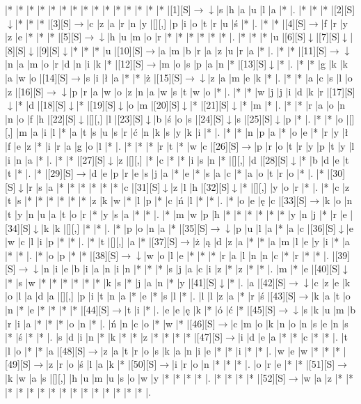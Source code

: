 \documentclass[11pt]{article}
\newcommand\drarr{$\rightarrow \!\!\!\!\! \downarrow$}
\newcommand\rarr{$\rightarrow$}
\newcommand\darr{$\downarrow$}
\begin{document}
\noindent\begin{Puzzle}{22}{31}|*	|*	|*	|*	|*	|*	|*	|*	|*	|*	|*	|*	|*	|*	|*	|[1][S]\drarr	|s	|h	|a	|u	|l	|a	|*	|.
|*	|*	|*	|[2][S]\darr	|*	|*	|*	|[3][S]\rarr	|c	|z	|a	|r	|n	|y	|[][,]{ }	|p	|i	|o	|t	|r	|u	|ś	|*	|.
|*	|*	|[4][S]\rarr	|f	|r	|y	|z	|e	|*	|*	|*	|[5][S]\drarr	|h	|u	|m	|o	|r	|*	|*	|*	|*	|*	|*	|.
|*	|*	|*	|u	|[6][S]\darr	|[7][S]\darr	|[8][S]\darr	|[9][S]\darr	|*	|*	|*	|u	|[10][S]\rarr	|a	|m	|b	|r	|a	|z	|u	|r	|a	|*	|.
|*	|*	|[11][S]\drarr	|n	|a	|m	|o	|r	|d	|n	|i	|k	|*	|[12][S]\rarr	|m	|o	|s	|p	|a	|n	|*	|[13][S]\darr	|*	|.
|*	|*	|g	|k	|k	|a	|w	|o	|[14][S]\rarr	|s	|i	|ł	|a	|*	|*	|ż	|[15][S]\drarr	|z	|a	|m	|e	|k	|*	|.
|*	|*	|a	|c	|s	|l	|o	|z	|[16][S]\drarr	|p	|r	|a	|w	|o	|z	|n	|a	|w	|s	|t	|w	|o	|*	|.
|*	|*	|w	|j	|j	|i	|d	|k	|r	|[17][S]\darr	|*	|d	|[18][S]\darr	|*	|[19][S]\darr	|o	|m	|[20][S]\darr	|*	|[21][S]\darr	|*	|m	|*	|.
|*	|*	|r	|a	|o	|n	|n	|o	|f	|h	|[22][S]\darr	|[][,]{ }	|l	|[23][S]\darr	|b	|ś	|o	|s	|[24][S]\darr	|s	|[25][S]\darr	|p	|*	|.
|*	|*	|o	|[][,]{ }	|m	|a	|i	|l	|*	|a	|t	|s	|u	|s	|r	|ć	|n	|k	|s	|y	|k	|i	|*	|.
|*	|*	|n	|p	|a	|*	|o	|e	|*	|r	|y	|ł	|f	|e	|z	|*	|i	|r	|a	|g	|o	|l	|*	|.
|*	|*	|*	|r	|t	|*	|w	|c	|[26][S]\rarr	|p	|r	|o	|t	|r	|y	|p	|t	|y	|l	|i	|n	|a	|*	|.
|*	|*	|[27][S]\darr	|z	|[][,]{ }	|*	|c	|*	|*	|i	|s	|n	|*	|[][,]{ }	|d	|[28][S]\darr	|*	|b	|d	|e	|t	|t	|*	|.
|*	|[29][S]\rarr	|d	|e	|p	|r	|e	|s	|j	|a	|*	|e	|*	|s	|a	|c	|*	|a	|o	|t	|r	|o	|*	|.
|*	|[30][S]\darr	|r	|s	|a	|*	|*	|*	|*	|*	|*	|c	|[31][S]\darr	|z	|l	|h	|[32][S]\darr	|*	|[][,]{ }	|y	|o	|r	|*	|.
|*	|c	|z	|t	|s	|*	|*	|*	|*	|*	|*	|z	|k	|w	|*	|l	|p	|*	|c	|ń	|l	|*	|*	|.
|*	|o	|e	|ę	|c	|[33][S]\rarr	|k	|o	|n	|t	|y	|n	|u	|a	|t	|o	|r	|*	|y	|s	|a	|*	|*	|.
|*	|m	|w	|p	|h	|*	|*	|*	|*	|*	|*	|y	|n	|j	|*	|r	|e	|[34][S]\darr	|k	|k	|[][,]{ }	|*	|*	|.
|*	|p	|o	|n	|a	|*	|[35][S]\drarr	|p	|u	|l	|a	|*	|a	|c	|[36][S]\darr	|e	|w	|c	|l	|i	|p	|*	|*	|.
|*	|t	|[][,]{ }	|a	|*	|[37][S]\rarr	|ż	|ą	|d	|z	|a	|*	|*	|a	|m	|l	|e	|y	|i	|*	|a	|*	|*	|.
|*	|o	|p	|*	|*	|[38][S]\drarr	|w	|o	|l	|e	|*	|*	|*	|r	|a	|l	|n	|n	|c	|*	|r	|*	|*	|.
|[39][S]\drarr	|n	|i	|e	|b	|i	|a	|n	|i	|n	|*	|*	|*	|s	|j	|a	|c	|i	|z	|*	|z	|*	|*	|.
|m	|*	|e	|[40][S]\darr	|*	|s	|w	|*	|*	|*	|*	|*	|*	|k	|s	|*	|j	|a	|n	|*	|y	|[41][S]\darr	|*	|.
|a	|[42][S]\drarr	|c	|z	|e	|k	|o	|l	|a	|d	|a	|[][,]{ }	|p	|i	|t	|n	|a	|*	|e	|*	|s	|l	|*	|.
|l	|l	|z	|a	|*	|r	|ś	|[43][S]\rarr	|k	|a	|t	|o	|n	|*	|e	|*	|*	|*	|*	|[44][S]\rarr	|t	|i	|*	|.
|e	|e	|ę	|k	|*	|ó	|ć	|*	|[45][S]\drarr	|s	|k	|u	|m	|b	|r	|i	|a	|*	|*	|*	|o	|n	|*	|.
|ń	|n	|c	|o	|*	|w	|*	|[46][S]\rarr	|c	|m	|o	|k	|n	|o	|n	|s	|e	|n	|s	|*	|ś	|*	|*	|.
|s	|d	|i	|n	|*	|k	|*	|*	|z	|*	|*	|*	|*	|[47][S]\rarr	|i	|d	|e	|a	|*	|*	|c	|*	|*	|.
|t	|l	|o	|*	|*	|a	|[48][S]\rarr	|z	|a	|t	|r	|o	|s	|k	|a	|n	|i	|e	|*	|*	|i	|*	|*	|.
|w	|e	|w	|*	|*	|*	|[49][S]\rarr	|z	|r	|o	|ś	|l	|a	|k	|*	|[50][S]\rarr	|i	|r	|o	|n	|*	|*	|*	|.
|o	|r	|e	|*	|*	|[51][S]\rarr	|k	|w	|a	|s	|[][,]{ }	|h	|u	|m	|u	|s	|o	|w	|y	|*	|*	|*	|*	|.
|*	|*	|*	|*	|[52][S]\rarr	|w	|a	|z	|*	|*	|*	|*	|*	|*	|*	|*	|*	|*	|*	|*	|*	|*	|*	|.\end{Puzzle}
\end{document}
